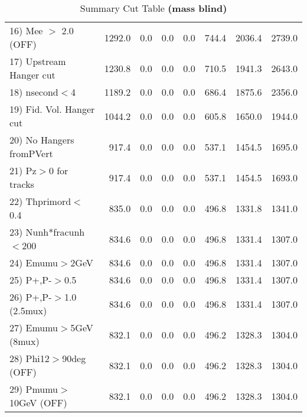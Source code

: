 \begin{table}[h!]
{{\begin{tabular}{||l||r|r|r|r|r||r||r||}
 16) Mee $>$ 2.0  (OFF)   &    1292.0 &       0.0 &       0.0 &       0.0 &     744.4 &    2036.4 &    2739.0 \\
 17) Upstream Hanger cut  &    1230.8 &       0.0 &       0.0 &       0.0 &     710.5 &    1941.3 &    2643.0 \\
 18) nsecond$<$4          &    1189.2 &       0.0 &       0.0 &       0.0 &     686.4 &    1875.6 &    2356.0 \\
 19) Fid. Vol. Hanger cut &    1044.2 &       0.0 &       0.0 &       0.0 &     605.8 &    1650.0 &    1944.0 \\
 20) No Hangers fromPVert &     917.4 &       0.0 &       0.0 &       0.0 &     537.1 &    1454.5 &    1695.0 \\
 21) Pz$>$0 for tracks    &     917.4 &       0.0 &       0.0 &       0.0 &     537.1 &    1454.5 &    1693.0 \\
 22) Thprimord$<$0.4      &     835.0 &       0.0 &       0.0 &       0.0 &     496.8 &    1331.8 &    1341.0 \\
 23) Nunh*fracunh$<$200   &     834.6 &       0.0 &       0.0 &       0.0 &     496.8 &    1331.4 &    1307.0 \\
 24) Emumu$>$2GeV         &     834.6 &       0.0 &       0.0 &       0.0 &     496.8 &    1331.4 &    1307.0 \\
 25) P+,P-$>$0.5          &     834.6 &       0.0 &       0.0 &       0.0 &     496.8 &    1331.4 &    1307.0 \\
 26) P+,P-$>$1.0 (2.5mux) &     834.6 &       0.0 &       0.0 &       0.0 &     496.8 &    1331.4 &    1307.0 \\
 27) Emumu$>$5GeV  (8mux) &     832.1 &       0.0 &       0.0 &       0.0 &     496.2 &    1328.3 &    1304.0 \\
 28) Phi12$>$90deg  (OFF) &     832.1 &       0.0 &       0.0 &       0.0 &     496.2 &    1328.3 &    1304.0 \\
 29) Pmumu$>$10GeV  (OFF) &     832.1 &       0.0 &       0.0 &       0.0 &     496.2 &    1328.3 &    1304.0 \\
 \hline
 \hline
 \end{tabular}
 \caption{Summary Cut Table \textbf{ (mass blind)}}
 \label{tab-sumcut}
 }}
 \end{table}
 \endinput
